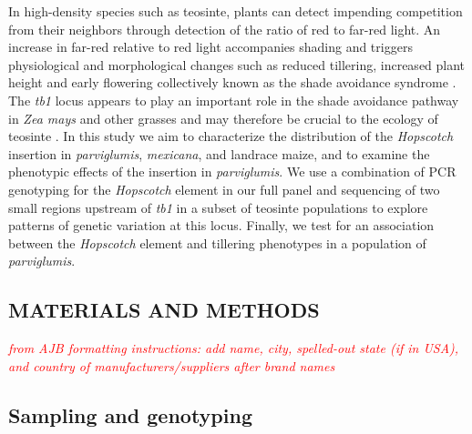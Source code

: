 \documentclass[11pt]{article}
\newcommand{\mbh}[1]{\textcolor{red}{ \emph{\scriptsize  #1}} }
\begin{document}
\begin{linenumbers}
\begin{flushleft}
In high-density species such as teosinte, plants can detect impending competition from their neighbors through detection of the ratio of red to far-red light. An increase in far-red relative to red light accompanies shading and triggers physiological and morphological changes such as reduced tillering, increased plant height and early flowering collectively known as the shade avoidance syndrome \citep{KebromBrutnell2007}. The \emph{tb1} locus appears to play an important role in the shade avoidance pathway in \emph{Zea mays} and other grasses and may therefore be crucial to the ecology of teosinte \citep{KebromBrutnell2007, LukensDoebley1999}.  In this study we aim to characterize the distribution of the \emph{Hopscotch} insertion in \emph{parviglumis}, \emph{mexicana}, and landrace maize, and to examine the phenotypic effects of the insertion in \emph{parviglumis}. We use a combination of PCR genotyping for the \emph{Hopscotch} element in our full panel and sequencing of two small regions upstream of \emph{tb1} in a subset of teosinte populations to explore patterns of genetic variation at this locus. Finally, we test for an association between the \emph{Hopscotch} element and tillering phenotypes in a population of \emph{parviglumis}.

\begin{centering}
\section*{MATERIALS AND METHODS}
\end{centering}

\mbh{from AJB formatting instructions: add name, city, spelled-out state (if in USA), and country of manufacturers/suppliers after brand names}

\subsection*{Sampling and genotyping}


\end{flushleft}
\end{linenumbers}
\end{document}
